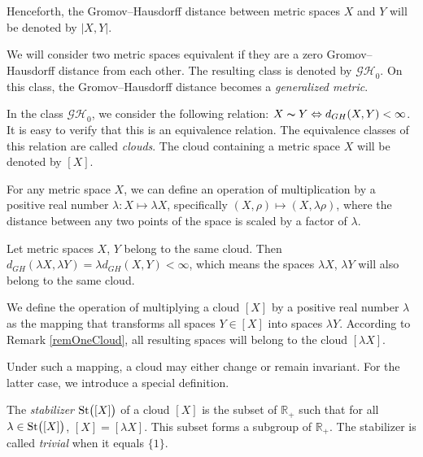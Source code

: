 \documentclass[leqno]{article}
\begin{document}
Henceforth, the Gromov--Hausdorff distance between metric spaces $ X
$ and $ Y $ will be denoted by $ |X,Y| $.

We will consider two metric spaces equivalent if they are a zero
Gromov--Hausdorff distance from each other. The resulting class is
denoted by $ \mathcal{GH}_0 $. On this class, the Gromov--Hausdorff
distance becomes a \emph{generalized metric}.

\begin{defin}
  In the class $\mathcal{GH}_{0}$, we consider the following
  relation: $X \thicksim Y \Leftrightarrow d_{GH}(X, Y) < \infty$. It
  is easy to verify that this is an equivalence relation. The
  equivalence classes of this relation are called \emph{clouds}. The
  cloud containing a metric space $X$ will be denoted by $[X]$.
\end{defin}

For any metric space $X$, we can define an operation of
multiplication by a positive real number $\lambda\colon X\mapsto
\lambda X$, specifically $(X, \rho) \mapsto (X, \lambda \rho)$, where
the distance between any two points of the space is scaled by a
factor of $\lambda$.

\begin{remark}
  Let metric spaces $X$, $Y$ belong to the same cloud. Then
  $d_{GH}(\lambda X, \lambda Y) = \lambda d_{GH}(X,Y)\allowbreak <
  \infty$, which means the spaces $\lambda X$, $\lambda Y$ will also
  belong to the same cloud.
  \label{remOneCloud}
\end{remark}

\begin{defin}
  We define the operation of multiplying a cloud $[X]$ by a positive
  real number $\lambda$ as the mapping that transforms all spaces $Y
  \in [X]$ into spaces $\lambda Y$. According to Remark
  \ref{remOneCloud}, all resulting spaces will belong to the cloud
  $[\lambda X]$.
\end{defin}

Under such a mapping, a cloud may either change or remain invariant.
For the latter case, we introduce a special definition.

\begin{defin}
  The \emph{stabilizer} $\operatorname{St}\bigl([X]\bigr)$ of a cloud $[X]$ is the
  subset of $\mathbb{R}_+$ such that for all $\lambda \in
  \operatorname{St}\bigl([X]\bigr)$, $[X] = [\lambda X]$. This subset forms a
  subgroup of $\mathbb{R}_+$. The stabilizer is called \emph{trivial}
  when it equals $\{1\}$.
\end{defin}
\end{document}
